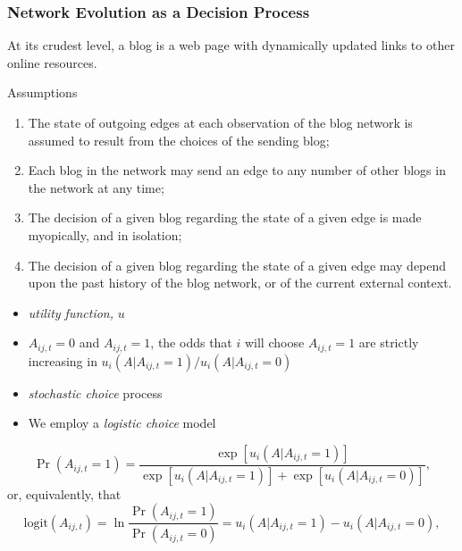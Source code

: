 \documentclass{beamer}
\begin{document}
\begin{frame}
\frametitle{Network Evolution as a Decision Process}

\begin{block}{}
At its crudest level, a blog is a web page with dynamically updated links to other online resources.  
\end{block}

\begin{block}{Assumptions}
\begin{enumerate}
\item The state of outgoing edges at each observation of the blog network is assumed to result from the choices of the sending blog;
\item Each blog in the network may send an edge to any number of other blogs in the network at any time;
\item The decision of a given blog regarding the state of a given edge is made myopically, and in isolation;
\item The decision of a given blog regarding the state of a given edge may depend upon the past history of the blog network, or of the current external context.
\end{enumerate}

\end{block}


\end{frame}

\begin{frame}
\begin{block}{}
\begin{itemize}
\item \emph{utility function,} $u$
\item $A_{ij,t}=0$ and $A_{ij,t}=1$, the odds that $i$ will choose $A_{ij,t}=1$ are strictly increasing in $u_i(A|A_{ij,t}=1)/u_i(A|A_{ij,t}=0)$
\item \emph{stochastic choice} process
\item We employ a  \emph{logistic choice} model
\end{itemize}
\end{block}
\begin{block}{}
\begin{equation}
\Pr(A_{ij,t}=1) = \frac{\exp\left[u_i\left(A|A_{ij,t}=1\right)\right]}{\exp\left[u_i\left(A|A_{ij,t}=1\right)\right]+\exp\left[u_i\left(A|A_{ij,t}=0\right)\right]}, \label{eq:logit1}
\end{equation}
or, equivalently, that
\begin{equation}
\textrm{logit}(A_{ij,t}) = \ln\frac{\Pr(A_{ij,t}=1)}{\Pr(A_{ij,t}=0)} = u_i\left(A|A_{ij,t}=1\right)-u_i\left(A|A_{ij,t}=0\right),\label{eq:logit2}
\end{equation}
\end{block}

\end{frame}
\end{document}
